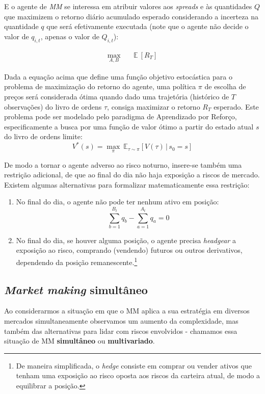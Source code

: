 E o agente de \textit{MM} se interessa em atribuir valores aos \textit{spreads} e às quantidades $Q$ que maximizem o retorno diário acumulado esperado considerando a incerteza na quantidade $q$ que será efetivamente executada (note que o agente não decide o valor de $q_{i, t}$, apenas o valor de $Q_{i, t}$):

\begin{equation}
	\begin{aligned}
		\max_{A, B} \quad & \mathbb{E} \ [R_T]
	\end{aligned}
\end{equation}

Dada a equação acima que define uma função objetivo estocástica para  o problema de maximização do retorno do agente, uma política $\pi$ de escolha de preços será considerada ótima quando dado uma trajetória (histórico de $T$ observações) do livro de ordens $\tau$, consiga maximizar o retorno $R_{T}$ esperado. Este problema pode ser modelado pelo paradigma de Aprendizado por Reforço, especificamente a busca por uma função de valor ótimo a partir do estado atual $s$ do livro de ordens limite:
\begin{equation}
	V^{*}(s) = \underset{\pi}{\max} \ \mathbb{E}_{\tau \sim \pi} \left[ V(\tau) \, | \, s_0 = s \right]
\end{equation}

De modo a tornar o agente adverso ao risco noturno, insere-se também uma restrição adicional, de que ao final do dia não haja exposição a riscos de mercado. 
Existem algumas alternativas para formalizar matematicamente essa restrição:
\begin{enumerate}
    \item No final do dia, o agente não pode ter nenhum ativo em posição: 
    \begin{equation}
        \sum_{b=1}^{B_t} q_b  - \sum_{a=1}^{A_t} q_a = 0\label{eq:eod_restriction}
    \end{equation}
    \item No final do dia, se houver alguma posição, o agente precisa \textit{headgear} a exposição ao risco, comprando (vendendo) futuros ou outros derivativos, dependendo da posição remanescente.\footnote{De maneira simplificada, o \textit{hedge} consiste em comprar ou vender ativos que tenham uma exposição ao risco oposta aos riscos da carteira atual, de modo a equilibrar a posição.}
\end{enumerate}

\subsection{\textit{Market making} simultâneo}
Ao considerarmos a situação em que o MM aplica a sua estratégia em diversos mercados simultaneamente observamos um aumento da complexidade, mas também das alternativas para lidar com riscos envolvidos - chamamos essa situação de MM \textbf{simultâneo} ou \textbf{multivariado}.


